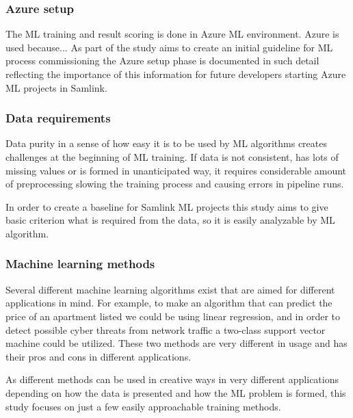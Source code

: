 \subsubsection*{Azure setup}
The ML training and result scoring
is done in Azure ML environment.
Azure is used because... %
As part of the study aims to create
an initial guideline for
ML process commissioning
the Azure setup phase is documented in such detail
reflecting the importance of this information
for future developers
starting Azure ML projects in Samlink.






\subsubsection*{Data requirements}
Data purity in a sense of
how easy it is to be used by ML algorithms
creates challenges at the beginning of ML training.
If data is not consistent,
has lots of missing values
or is formed in unanticipated way,
it requires considerable amount of preprocessing
slowing the training process
and causing errors in pipeline runs.

In order to create a baseline for Samlink ML projects
this study aims to give basic criterion
what is required from the data,
so it is easily analyzable by ML algorithm.


\subsubsection*{Machine learning methods}
Several different machine learning algorithms exist
that are aimed for different applications in mind.
For example,
to make an algorithm that can predict
the price of an apartment listed\cite{winky}
we could be using linear regression,
and in order to detect
possible cyber threats from network traffic\cite{ghanem}
a two-class support vector machine could be utilized.
These two methods are very different in usage
and has their pros and cons in different applications.

As different methods can be used in creative ways
in very different applications
depending on how the data is presented
and how the ML problem is formed,
this study focuses on
just a few easily approachable training methods.

